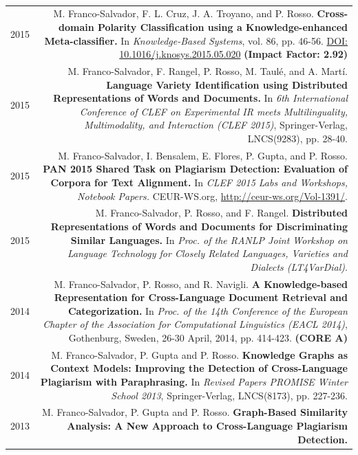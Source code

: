 \documentclass[10pt]{article}
\begin{document}
   \\
\begin{tabular}{L!{\VRule}R}
2015&M. Franco-Salvador, F. L. Cruz, J. A. Troyano, and P. Rosso. \textbf{Cross-domain Polarity Classification using a Knowledge-enhanced Meta-classifier.}
	In \emph{Knowledge-Based Systems}, vol. 86, pp. 46-56. \href{http://dx.doi.org/10.1016/j.knosys.2015.05.020}{DOI: 10.1016/j.knosys.2015.05.020} \textbf{(Impact Factor: 2.92)} \vspace{5pt}\\
2015&M. Franco-Salvador, F. Rangel, P. Rosso, M. Taul{\'e}, and A. Mart{\'i}. \textbf{Language Variety Identification using Distributed Representations of Words and Documents.}
	In \emph{6th International Conference of CLEF on Experimental IR meets Multilinguality, Multimodality, and Interaction (CLEF 2015)}, Springer-Verlag, LNCS(9283), pp. 
28-40. \vspace{5pt}\\
2015&M. Franco-Salvador, I. Bensalem, E. Flores, P. Gupta, and P. Rosso. \textbf{PAN 2015 Shared Task on Plagiarism Detection: Evaluation of Corpora for Text Alignment.}
    In \emph{CLEF 2015 Labs and Workshops, Notebook Papers.} CEUR-WS.org, \href{http://ceur-ws.org/Vol-1391/}{http://ceur-ws.org/Vol-1391/}. \vspace{5pt}\\
2015&M. Franco-Salvador, P. Rosso, and F. Rangel. \textbf{Distributed Representations of Words and Documents for Discriminating Similar Languages.}
    In \emph{Proc. of the RANLP Joint Workshop on Language Technology for Closely Related Languages, Varieties and Dialects (LT4VarDial)}. \vspace{5pt}\\
2014&M. Franco-Salvador, P. Rosso, and R. Navigli. \textbf{A Knowledge-based Representation for Cross-Language Document Retrieval and Categorization.}
    In \emph{Proc. of the 14th Conference of the European Chapter of the Association for Computational Linguistics (EACL 2014)}, Gothenburg, Sweden, 26-30 April, 2014, pp. 414-423. \textbf{(CORE A)} \vspace{5pt}\\
2014&M. Franco-Salvador, P. Gupta and P. Rosso. \textbf{Knowledge Graphs as Context Models: Improving the Detection of Cross-Language Plagiarism with Paraphrasing.}
    In \emph{Revised Papers PROMISE Winter School 2013}, Springer-Verlag, LNCS(8173), pp. 227-236.\vspace{5pt}\\
2013&M. Franco-Salvador, P. Gupta and P. Rosso. \textbf{Graph-Based Similarity Analysis: A New Approach to Cross-Language Plagiarism Detection.}

\end{tabular}
\end{document}
